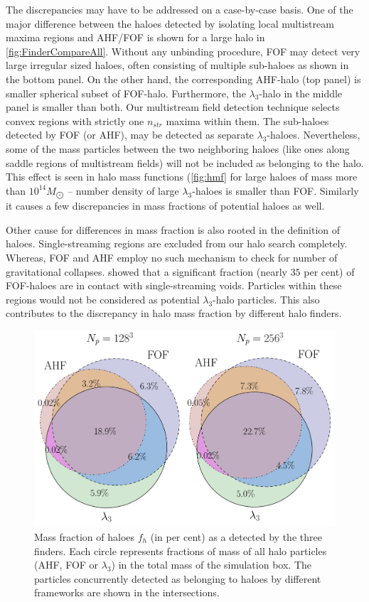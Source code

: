 The discrepancies may have to be addressed on a case-by-case basis. One of the major difference between the haloes detected by isolating local multistream maxima regions and AHF/FOF is shown for a large halo in \autoref{fig:FinderCompareAll}. Without any unbinding procedure, FOF may detect very large irregular sized haloes, often consisting of multiple sub-haloes as shown in the bottom panel. On the other hand, the corresponding AHF-halo (top panel) is smaller spherical subset of FOF-halo. Furthermore, the $\lambda_3$-halo in the middle panel is smaller than both. Our multistream field detection technique selects convex regions with strictly one $n_{str}$ maxima within them. The sub-haloes detected by FOF (or AHF), may be detected as separate $\lambda_3$-haloes. Nevertheless, some of the mass particles between the two neighboring haloes (like ones along saddle regions of multistream fields) will not be included as belonging to the halo. This effect is seen in halo mass functions (\autoref{fig:hmf} for large haloes of mass more than $10^{14} M_{\bigodot}$ -- number density of large $\lambda_3$-haloes is smaller than FOF. Similarly it causes a few discrepancies in mass fractions of potential haloes as well. 

Other cause for differences in mass fraction is also rooted in the definition of haloes. Single-streaming regions are excluded from our halo search completely. Whereas, FOF and AHF employ no such mechanism to check for number of gravitational collapses. \cite{Ramachandra2015} showed that a significant fraction (nearly $35$ per cent) of FOF-haloes are in contact with single-streaming voids. Particles within these regions would not be considered as potential $\lambda_3$-halo particles. This also contributes to the discrepancy in halo mass fraction by different halo finders. 
 

\begin{figure}
\begin{minipage}[t]{.99\linewidth}
 \centering
 \includegraphics[width=10.cm]{Chapter5/Source_v2/fig13.pdf}
\end{minipage}\hfill
\caption{Mass fraction of haloes $f_h$ (in per cent) as a detected by the three finders. Each circle represents fractions of mass of all halo particles (AHF, FOF or $\lambda_3$) in the total mass of the simulation box. The particles concurrently detected as belonging to haloes by different frameworks are shown in the intersections. }
\label{fig:HaloFinderMF}
\end{figure}


